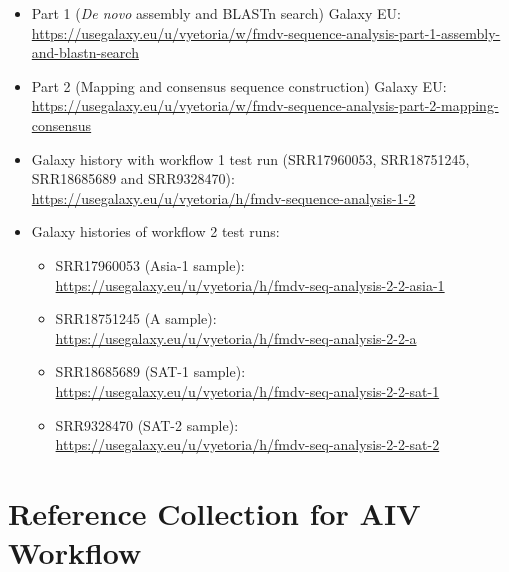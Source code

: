 \begin{itemize}
	\setlength{\itemsep}{-0.4cm}
	\item Part 1 (\textit{De novo} assembly and BLASTn search) Galaxy EU:\\
	\url{https://usegalaxy.eu/u/vyetoria/w/fmdv-sequence-analysis-part-1-assembly-and-blastn-search}
	\item Part 2 (Mapping and consensus sequence construction) Galaxy EU:\\
	\url{https://usegalaxy.eu/u/vyetoria/w/fmdv-sequence-analysis-part-2-mapping-consensus}
	\item Galaxy history with workflow 1 test run (SRR17960053, SRR18751245, SRR18685689 and SRR9328470):\\
	\url{https://usegalaxy.eu/u/vyetoria/h/fmdv-sequence-analysis-1-2}
	\item Galaxy histories of workflow 2 test runs:
	\begin{itemize}
		\setlength{\itemsep}{-0.4cm}
		\vspace*{-0.4cm}
		\item SRR17960053 (Asia-1 sample):\\
		\url{https://usegalaxy.eu/u/vyetoria/h/fmdv-seq-analysis-2-2-asia-1}
		\item SRR18751245 (A sample):\\
		\url{https://usegalaxy.eu/u/vyetoria/h/fmdv-seq-analysis-2-2-a}
		\item SRR18685689 (SAT-1 sample):\\
		\url{https://usegalaxy.eu/u/vyetoria/h/fmdv-seq-analysis-2-2-sat-1}
		\item SRR9328470 (SAT-2 sample):\\
		\url{https://usegalaxy.eu/u/vyetoria/h/fmdv-seq-analysis-2-2-sat-2}
	\end{itemize}
\end{itemize}


\section*{\thesection \quad Reference Collection for AIV Workflow}

